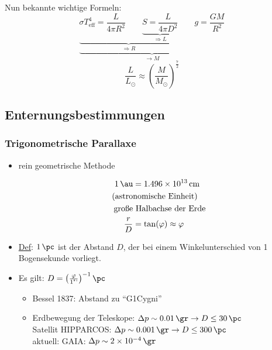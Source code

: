 Nun bekannte wichtige Formeln:
\begin{equation*}
\underset{\to M}{\underbrace{\underset{\Rightarrow R}{\underbrace{\sigma T_\text{eff}^4=\frac{L}{4\pi R^2} \qquad \underset{\Rightarrow L}{\underbrace{S=\frac{L}{4\pi D^2}}}}} \qquad g=\frac{GM}{R^2}}}
\end{equation*}
\begin{equation*}
\frac{L}{L_\odot}\approx\left(\frac{M}{M_\odot}\right)^\frac{7}{2}
\end{equation*}
\subsection{Enternungsbestimmungen}
\subsubsection{Trigonometrische Parallaxe}
\begin{itemize}
\item rein geometrische Methode
\begin{figure}[H]
\begin{multicols}{2}
\begin{figure}[H]
\end{figure}\columnbreak
\begin{align*}
\SI{1}{\au}&=\SI{1.496e13}{\cm}\\
\text{(astro}&\text{nomische Einheit)}\\
\text{große}&\text{ Halbachse der Erde}\\
\frac{r}{D}&=\tan(\varphi)\approx\varphi
\end{align*}
\end{multicols}
\end{figure}
\item \underline{Def}: $\SI{1}{\pc}$ ist der Abstand $D$, der bei einem Winkelunterschied von 1 Bogensekunde vorliegt.
\item Es gilt: $D=\left(\frac{\varphi}{1\text{"'}}\right)^{-1}\si{\pc}$
\begin{itemize}
\item Bessel 1837: Abstand zu "`G1Cygni"'
\item Erdbewegung der Teleskope: $\Delta p\sim \SI{0.01}{\gr} \to D\leq \SI{30}{\pc}$\\
Satellit HIPPARCOS: $\Delta p\sim \SI{0.001}{\gr} \to D\leq \SI{300}{\pc}$\\
aktuell: GAIA: $\Delta p \sim \SI{2e-4}{\gr}$
\end{itemize}
\end{itemize}

